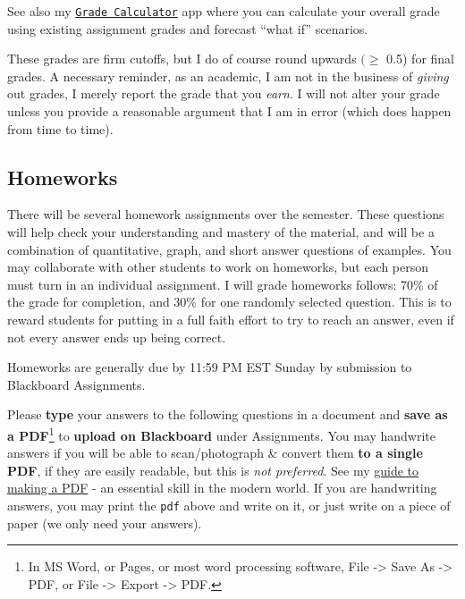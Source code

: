 \documentclass{article}
\begin{document}
See also my
\href{https://ryansafner.shinyapps.io/law_grade_calculator/}{
\texttt{Grade\ Calculator}} app where you can calculate your overall
grade using existing assignment grades and forecast ``what if''
scenarios.

These grades are firm cutoffs, but I do of course round upwards
\((\geq\) 0.5) for final grades. A necessary reminder, as an academic, I
am not in the business of \emph{giving} out grades, I merely report the
grade that you \emph{earn}. I will not alter your grade unless you
provide a reasonable argument that I am in error (which does happen from
time to time).

\hypertarget{homeworks}{%
\subsection*{Homeworks}\label{homeworks}}

There will be several homework assignments over the semester. These
questions will help check your understanding and mastery of the
material, and will be a combination of quantitative, graph, and short
answer questions of examples. You may collaborate with other students to
work on homeworks, but each person must turn in an individual
assignment. I will grade homeworks follows: 70\% of the grade for
completion, and 30\% for one randomly selected question. This is to
reward students for putting in a full faith effort to try to reach an
answer, even if not every answer ends up being correct.

Homeworks are generally due by 11:59 PM EST Sunday by submission to
Blackboard Assignments.

Please \textbf{type} your answers to the following questions in a
document and \textbf{save as a PDF}\footnote{In MS Word, or Pages, or
  most word processing software, File -\textgreater{} Save As
  -\textgreater{} PDF, or File -\textgreater{} Export -\textgreater{}
  PDF.} to \textbf{upload on Blackboard} under Assignments. You may
handwrite answers if you will be able to scan/photograph \& convert them
\textbf{to a single PDF}, if they are easily readable, but this is
\emph{not preferred}. See my
\href{https://microS21.classes.ryansafner.com/resources/\#how-to-make-a-pdf-for-submitting-assignments}{guide
to making a PDF} - an essential skill in the modern world. If you are
handwriting answers, you may print the \texttt{pdf} above and write on
it, or just write on a piece of paper (we only need your answers).
\end{document}
